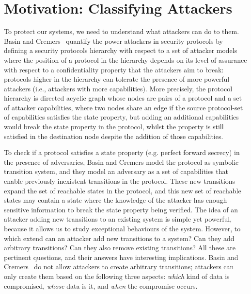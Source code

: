 \section{Motivation: Classifying Attackers}
To protect our systems, we need to understand what attackers can do to them. Basin and Cremers~\cite{KnowYourEnemy} quantify the power attackers in security protocols by defining a security protocols hierarchy with respect to a set of attacker models where %
the position of a protocol in the hierarchy depends on its level of assurance with respect to a confidentiality property that the attackers aim to break: protocols higher in the hierarchy can tolerate the presence of more powerful attackers (i.e., attackers with more capabilities). More precisely, the protocol hierarchy is directed acyclic graph whose nodes are pairs of a protocol and a set of attacker capabilities, where two nodes share an edge if the source protocol-set of capabilities satisfies the state property, but adding an additional capabilities would break the state property in the protocol, whilst the property is still satisfied in the destination node despite the addition of those capabilities.

To check if a protocol satisfies a state property (e.g. perfect forward secrecy) in the presence of adversaries, Basin and Cremers model the protocol as symbolic transition system, and they model an adversary as a set of capabilities that enable previously inexistent transitions in the protocol. These new transitions expand the set of reachable states in the protocol, and this new set of reachable states may contain a state where the knowledge of the attacker has enough sensitive information to break the state property being verified. The idea of an attacker adding new transitions to an existing system is simple yet powerful, because it allows us to study exceptional behaviours of the system. However, to which extend can an attacker add new transitions to a system? Can they add arbitrary transitions? Can they also remove existing transitions? All these are pertinent questions, and their answers have interesting implications. Basin and Cremers~\cite{KnowYourEnemy} do not allow attackers to create arbitrary transitions; attackers can only create them based on the following three aspects: \emph{which} kind of data is compromised, \emph{whose} data is it, and \emph{when} the compromise occurs. 

